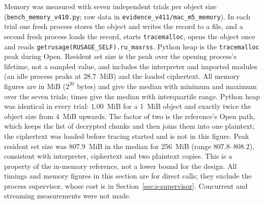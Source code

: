 \documentclass[pdflatex,sn-mathphys-num]{sn-jnl}
\newcommand{\code}[1]{\texttt{#1}}
\newcommand{\fpath}[1]{\nolinkurl{#1}}%
\theoremstyle{plain}
\begin{document}
Memory was measured with seven independent trials per object size (\fpath{bench_memory_v410.py}; raw data in \fpath{evidence_v411/mac_m5_memory}). In each trial one fresh process stores the object and writes the record to a file, and a second fresh process loads the record, starts \code{tracemalloc}, opens the object once and reads \code{getrusage(RUSAGE\_SELF).ru\_maxrss}. Python heap is the \code{tracemalloc} peak during Open. Resident set size is the peak over the opening process's lifetime, not a sampled value, and includes the interpreter and imported modules (an idle process peaks at $28.7$~MiB) and the loaded ciphertext. All memory figures are in MiB ($2^{20}$ bytes) and give the median with minimum and maximum over the seven trials; times give the median with interquartile range. Python heap was identical in every trial: $1.00$~MiB for a 1~MiB object and exactly twice the object size from 4~MiB upwards. The factor of two is the reference's Open path, which keeps the list of decrypted chunks and then joins them into one plaintext; the ciphertext was loaded before tracing started and is not in this figure. Peak resident set size was $807.9$~MiB in the median for 256~MiB (range $807.8$--$808.2$), consistent with interpreter, ciphertext and two plaintext copies. This is a property of the in-memory reference, not a lower bound for the design. All timings and memory figures in this section are for direct calls; they exclude the process supervisor, whose cost is in Section~\ref{sec:s-supervisor}. Concurrent and streaming measurements were not made.
\end{document}
